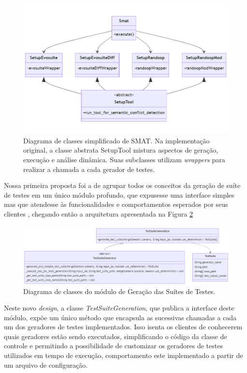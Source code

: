\documentclass[12pt]{article}
\begin{document}
\begin{figure}[H]
    \centering
    \includegraphics[width=\textwidth]{imagens/main.png}
    \caption{Diagrama de classes simplificado de SMAT. Na implementação original, a classe abstrata SetupTool mistura aspectos de geração, execução e análise dinâmica. Suas subclasses utilizam \textit{wrappers} para realizar a chamada a cada gerador de testes.}
    \label{fig:main}
\end{figure}

Nossa primeira proposta foi a de agrupar todos os conceitos da geração de suíte de testes em um único módulo profundo, que expusesse uma interface simples mas que atendesse às funcionalidades e comportamentos esperados por seus clientes \cite{ousterhout2018philosophy}, chegando então a arquitetura apresentada na Figura \ref{fig:tsg}

\begin{figure}[H]
    \centering
    \includegraphics[width=\textwidth]{imagens/tsg.png}
    \caption{Diagrama de classes do módulo de Geração das Suítes de Testes.}
    \label{fig:tsg}
\end{figure}

Neste novo \textit{design}, a classe \textit{TestSuiteGeneration}, que publica a interface deste módulo, expõe um único método que encapsula as sucessivas chamadas a cada um dos geradores de testes implementados. Isso isenta os clientes de conhecerem quais geradores estão sendo executados, simplificando o código da classe de controle e permitindo a possibilidade de customizar os geradores de testes utilizados em tempo de execução, comportamento este implementado a partir de um arquivo de configuração.
\end{document}
